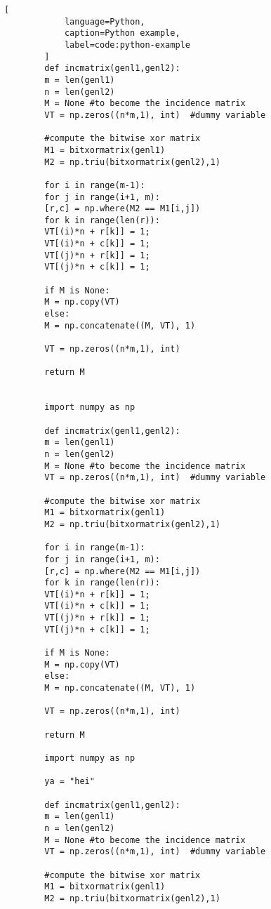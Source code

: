 \begin{appendix}
\begin{lstlisting}[
            language=Python,
            caption=Python example,
            label=code:python-example
        ]
        def incmatrix(genl1,genl2):
        m = len(genl1)
        n = len(genl2)
        M = None #to become the incidence matrix
        VT = np.zeros((n*m,1), int)  #dummy variable
        
        #compute the bitwise xor matrix
        M1 = bitxormatrix(genl1)
        M2 = np.triu(bitxormatrix(genl2),1)
        
        for i in range(m-1):
        for j in range(i+1, m):
        [r,c] = np.where(M2 == M1[i,j])
        for k in range(len(r)):
        VT[(i)*n + r[k]] = 1;
        VT[(i)*n + c[k]] = 1;
        VT[(j)*n + r[k]] = 1;
        VT[(j)*n + c[k]] = 1;
        
        if M is None:
        M = np.copy(VT)
        else:
        M = np.concatenate((M, VT), 1)
        
        VT = np.zeros((n*m,1), int)
        
        return M


        import numpy as np
        
        def incmatrix(genl1,genl2):
        m = len(genl1)
        n = len(genl2)
        M = None #to become the incidence matrix
        VT = np.zeros((n*m,1), int)  #dummy variable
        
        #compute the bitwise xor matrix
        M1 = bitxormatrix(genl1)
        M2 = np.triu(bitxormatrix(genl2),1)
        
        for i in range(m-1):
        for j in range(i+1, m):
        [r,c] = np.where(M2 == M1[i,j])
        for k in range(len(r)):
        VT[(i)*n + r[k]] = 1;
        VT[(i)*n + c[k]] = 1;
        VT[(j)*n + r[k]] = 1;
        VT[(j)*n + c[k]] = 1;
        
        if M is None:
        M = np.copy(VT)
        else:
        M = np.concatenate((M, VT), 1)
        
        VT = np.zeros((n*m,1), int)
        
        return M
        
        import numpy as np

        ya = "hei"
        
        def incmatrix(genl1,genl2):
        m = len(genl1)
        n = len(genl2)
        M = None #to become the incidence matrix
        VT = np.zeros((n*m,1), int)  #dummy variable
        
        #compute the bitwise xor matrix
        M1 = bitxormatrix(genl1)
        M2 = np.triu(bitxormatrix(genl2),1)
        

\end{lstlisting}
\end{appendix}
